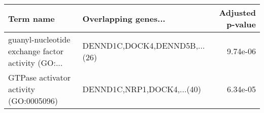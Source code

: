 \begin{tabular}{llr}
\toprule
                                         Term name &          Overlapping genes... &  Adjusted p-value \\
\midrule
guanyl-nucleotide exchange factor activity (GO:... & DENND1C,DOCK4,DENND5B,...(26) &          9.74e-06 \\
            GTPase activator activity (GO:0005096) &    DENND1C,NRP1,DOCK4,...(40) &          6.34e-05 \\
\bottomrule
\end{tabular}
